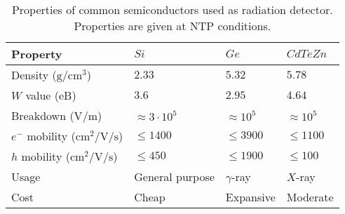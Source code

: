 \begin{table}[ht]
	\centering
	\caption[]{Properties of common semiconductors \cite{NSM2005,Eisen1996} used as radiation detector. Properties are given at NTP conditions.}
	\label{chap3:semiconductor}
	\begin{tabular}{llll}
    \toprule
    Property & $Si$ & $Ge$ & $CdTeZn$ \\
    \midrule
    Density ($\mathrm{g/cm^3}$)& $2.33$  & $5.32$ & $5.78$ \\
    $W$ value ($\mathrm{eB}$) & $3.6$ & $2.95$ & $4.64$ \\
    Breakdown ($\mathrm{V/m}$) & $\approx 3\cdot10^5$ & $\approx 10^5$ & $\approx 10^5$\\
    $e^{-}$ mobility ($\mathrm{cm^{2}/V/s}$) & $\leq 1400$ & $\leq 3900$ & $\leq 1100$\\
    $h$ mobility ($\mathrm{cm^{2}/V/s}$) & $\leq 450$ & $\leq 1900$ & $\leq 100$ \\
    Usage & General purpose & $\gamma$-ray & $X$-ray\\
    Cost & Cheap & Expansive & Moderate\\
		\bottomrule
	\end{tabular}
\end{table}